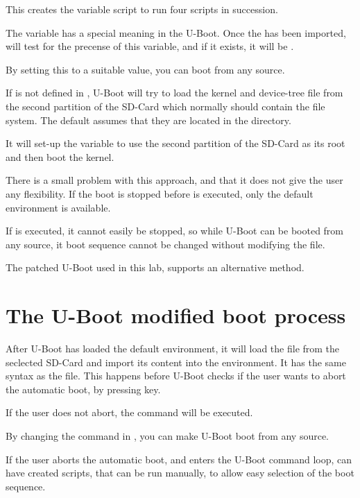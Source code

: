 This creates the variable script  to run four scripts in succession.

The variable  has a special meaning in the \devboard U-Boot.
Once the  has been imported,  will test
for the precense of this variable, and if it exists, it will be .

By setting this to a suitable value, you can boot from any source.

If  is not defined in , 
U-Boot will try to load the kernel and device-tree file
from the second partition of the SD-Card which
normally should contain the file system.
The default assumes that they are located in the  directory.

It will set-up the  variable to use the second partition
of the SD-Card as its root and then boot the kernel.

There is a small problem with this approach, and that it does 
not give the user any flexibility. If the boot is stopped before
 is executed, only the default environment is available.

If  is executed, it cannot easily be stopped, so while
U-Boot can be booted from any source, it boot sequence cannot be changed
without modifying the  file.

The patched U-Boot used in this lab, supports an alternative method.

\section{The U-Boot modified boot process}

After U-Boot has loaded the default environment, it will load the 
file from the seclected SD-Card and import its content into the environment. It has the same syntax as the  file.
This happens before U-Boot checks if the user wants to abort the automatic boot,
by pressing  key.

If the user does not abort, the  command will be executed.

By changing the  command in , you can make U-Boot
boot from any source.

If the user aborts the automatic boot, and enters the U-Boot command loop,
 can have created scripts, that can be run manually,
to allow easy selection of the boot sequence.


